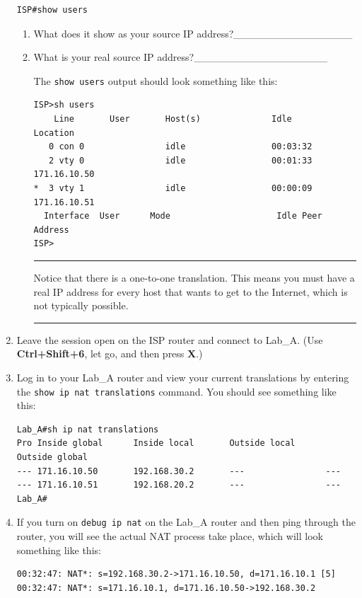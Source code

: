 \documentclass[b5paper,11pt]{memoir}
\begin{document}
\begin{enumerate}
\begin{verbatim}
ISP#show users
\end{verbatim}

  \begin{enumerate}
  \item
    What does it show as your source IP
    address?\_\_\_\_\_\_\_\_\_\_\_\_\_\_\_\_
  \item
    What is your real source IP
    address?\_\_\_\_\_\_\_\_\_\_\_\_\_\_\_\_\_\_

    The \texttt{show\ users} output should look something like this:

\begin{verbatim}
ISP>sh users
    Line       User       Host(s)              Idle       Location
   0 con 0                idle                 00:03:32
   2 vty 0                idle                 00:01:33 171.16.10.50
*  3 vty 1                idle                 00:00:09 171.16.10.51
  Interface  User      Mode                     Idle Peer Address
ISP>
\end{verbatim}

    \begin{center}\rule{0.5\linewidth}{0.5pt}\end{center}

    
    Notice
    that there is a one-to-one translation. This means you must have a
    real IP address for every host that wants to get to the Internet,
    which is not typically possible.

    \begin{center}\rule{0.5\linewidth}{0.5pt}\end{center}
  \end{enumerate}
\item
  Leave the session open on the ISP router and connect to Lab\_A. (Use
  \textbf{Ctrl+Shift+6}, let go, and then press \textbf{X}.)
\item
  Log in to your Lab\_A router and view your current translations by
  entering the \texttt{show\ ip\ nat\ translations} command. You should
  see something like this:

\begin{verbatim}
Lab_A#sh ip nat translations
Pro Inside global      Inside local       Outside local      Outside global
--- 171.16.10.50       192.168.30.2       ---                ---
--- 171.16.10.51       192.168.20.2       ---                ---
Lab_A#
\end{verbatim}
\item
  If you turn on \texttt{debug\ ip\ nat} on the Lab\_A router and then
  ping through the router, you will see the actual NAT process take
  place, which will look something like this:

\begin{verbatim}
00:32:47: NAT*: s=192.168.30.2->171.16.10.50, d=171.16.10.1 [5]
00:32:47: NAT*: s=171.16.10.1, d=171.16.10.50->192.168.30.2
\end{verbatim}
\end{enumerate}
\end{document}

